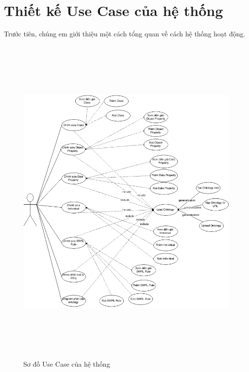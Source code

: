 \section{Thiết kế Use Case của hệ thống}
Trước tiên, chúng em giới thiệu một cách tổng quan về cách hệ thống hoạt động.
 \begin{figure}[ht!]
 	\centering
 	\includegraphics[width=155mm,height=170mm]{Figures/usecase.png}
 	\caption{Sơ đồ Use Case của hệ thống \label{overflow}}
 \end{figure}
